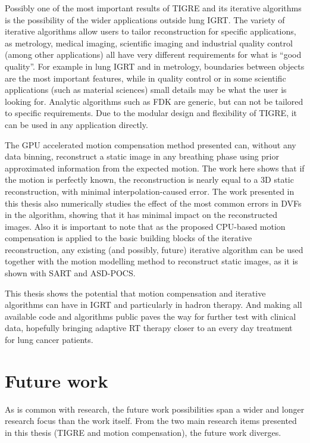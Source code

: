 Possibly one of the most important results of TIGRE and its iterative algorithms is the possibility of the wider applications outside lung IGRT. The variety of iterative algorithms allow users to tailor reconstruction for specific applications, as metrology, medical imaging, scientific imaging and industrial quality control (among other applications) all have very different requirements for what is ``good quality''. For example in lung IGRT and in metrology, boundaries between objects are the most important features, while in quality control or in some scientific applications (such as material sciences) small details may be what the user is looking for. Analytic algorithms such as FDK are generic, but can not be tailored to specific requirements. Due to the modular design and flexibility of TIGRE, it can be used in any application directly.


The GPU accelerated motion compensation method presented can, without any data binning, reconstruct a static image in any breathing phase using prior approximated information from the expected motion. The work here shows that if the motion is perfectly known, the reconstruction is nearly equal to a 3D static reconstruction, with minimal interpolation-caused error. The work presented in this thesis also numerically studies the effect of the most common errors in DVFs in the algorithm, showing that it has minimal impact on the reconstructed images. Also it is important to note that as the proposed CPU-based motion compensation is applied to the basic building blocks of the iterative reconstruction, any existing (and possibly, future) iterative algorithm can be used together with the motion modelling method to reconstruct static images, as it is shown with SART and ASD-POCS. 

This thesis shows the potential that motion compensation and iterative algorithms can have in IGRT and particularly in hadron therapy. And making all available code and algorithms public paves the way for further test with clinical data, hopefully bringing adaptive RT therapy closer to an every day treatment for lung cancer patients.


\section{Future work}

As is common with research, the future work possibilities span a wider and longer research focus than the work itself. From the two main research items presented  in this thesis (TIGRE and motion compensation), the future work diverges.

